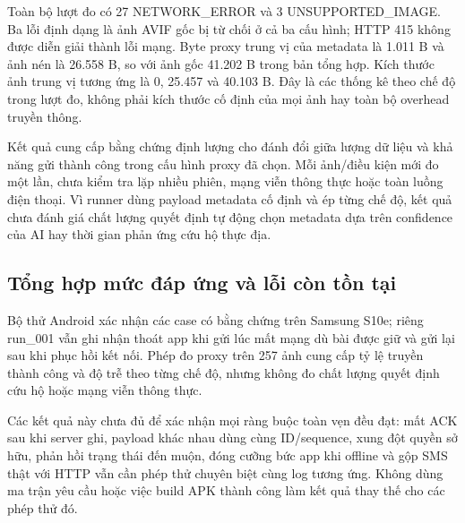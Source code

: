 Toàn bộ lượt đo có 27 NETWORK\_ERROR và 3 UNSUPPORTED\_IMAGE. Ba lỗi định dạng là ảnh AVIF gốc bị từ chối ở cả ba cấu hình; HTTP 415 không được diễn giải thành lỗi mạng. Byte proxy trung vị của metadata là 1.011 B và ảnh nén là 26.558 B, so với ảnh gốc 41.202 B trong bản tổng hợp. Kích thước ảnh trung vị tương ứng là 0, 25.457 và 40.103 B. Đây là các thống kê theo chế độ trong lượt đo, không phải kích thước cố định của mọi ảnh hay toàn bộ overhead truyền thông.

Kết quả cung cấp bằng chứng định lượng cho đánh đổi giữa lượng dữ liệu và khả năng gửi thành công trong cấu hình proxy đã chọn. Mỗi ảnh/điều kiện mới đo một lần, chưa kiểm tra lặp nhiều phiên, mạng viễn thông thực hoặc toàn luồng điện thoại. Vì runner dùng payload metadata cố định và ép từng chế độ, kết quả chưa đánh giá chất lượng quyết định tự động chọn metadata dựa trên confidence của AI hay thời gian phản ứng cứu hộ thực địa.

\subsection{Tổng hợp mức đáp ứng và lỗi còn tồn tại}
Bộ thử Android xác nhận các case có bằng chứng trên Samsung S10e; riêng run\_001 vẫn ghi nhận thoát app khi gửi lúc mất mạng dù bài được giữ và gửi lại sau khi phục hồi kết nối. Phép đo proxy trên 257 ảnh cung cấp tỷ lệ truyền thành công và độ trễ theo từng chế độ, nhưng không đo chất lượng quyết định cứu hộ hoặc mạng viễn thông thực.

Các kết quả này chưa đủ để xác nhận mọi ràng buộc toàn vẹn đều đạt: mất ACK sau khi server ghi, payload khác nhau dùng cùng ID/sequence, xung đột quyền sở hữu, phản hồi trạng thái đến muộn, đóng cưỡng bức app khi offline và gộp SMS thật với HTTP vẫn cần phép thử chuyên biệt cùng log tương ứng. Không dùng ma trận yêu cầu hoặc việc build APK thành công làm kết quả thay thế cho các phép thử đó.
